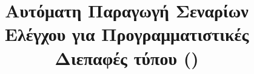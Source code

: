 \documentclass[modern,hyperref,histinit,noindex,plain,newlogo]{ntua-thesis}
\title{Αυτόματη Παραγωγή Σεναρίων Ελέγχου \break για Προγραμματιστικές Διεπαφές \break τύπου \en{REST} (\en{RESTful APIs})}
\begin{document}
\maketitle

\beginfrontmatter
	


%	

\tableofcontents

\listoffigures

%	
	
\beginmainmatter










\end{document}

